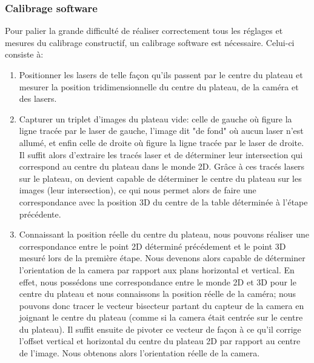 \documentclass[a4paper,10pt]{report}
\begin{document}
\subsubsection{Calibrage software}
Pour palier la grande difficulté de réaliser correctement tous les réglages et mesures du calibrage constructif, un calibrage software est nécessaire. Celui-ci consiste à:
\begin{enumerate}
\item Positionner les lasers de telle façon qu'ils passent par le centre du plateau et mesurer la position tridimensionnelle du centre du plateau, de la caméra et des lasers.
\item Capturer un triplet d'images du plateau vide: celle de gauche où figure la ligne tracée par le laser de gauche, l'image dit "de fond" où aucun laser n'est allumé, et enfin celle de droite où figure la ligne tracée par le laser de droite. Il suffit alors d'extraire les tracés laser et de déterminer leur intersection qui correspond au centre du plateau dans le monde 2D. Grâce à ces tracés lasers sur le plateau, on devient capable de déterminer le centre du plateau sur les images (leur intersection), ce qui nous permet alors de faire une correspondance avec la position 3D du centre de la table déterminée à l'étape précédente.
\item Connaissant la position réelle du centre du plateau, nous pouvons réaliser une correspondance entre le point 2D déterminé précédement et le point 3D mesuré lors de la première étape. Nous devenons alors capable de déterminer l'orientation de la camera par rapport aux plans horizontal et vertical. En effet, nous possédons une correspondance entre le monde 2D et 3D pour le centre du plateau et nous connaissons la position réelle de la caméra; nous pouvons donc tracer le vecteur bisecteur partant du capteur de la camera en joignant le centre du plateau (comme si la camera était centrée sur le centre du plateau). Il suffit ensuite de pivoter ce vecteur de façon à ce qu'il corrige l'offset vertical et horizontal du centre du plateau 2D par rapport au centre de l'image. Nous obtenons alors l'orientation réelle de la camera.


\end{enumerate}
\end{document}
